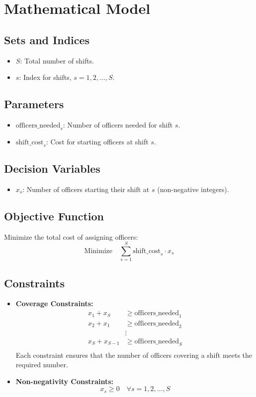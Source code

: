 \documentclass{article}
\begin{document}
\section*{Mathematical Model}

\subsection*{Sets and Indices}
\begin{itemize}
    \item \( S \): Total number of shifts.
    \item \( s \): Index for shifts, \( s = 1, 2, \ldots, S \).
\end{itemize}

\subsection*{Parameters}
\begin{itemize}
    \item \( \text{officers\_needed}_s \): Number of officers needed for shift \( s \).
    \item \( \text{shift\_cost}_s \): Cost for starting officers at shift \( s \).
\end{itemize}

\subsection*{Decision Variables}
\begin{itemize}
    \item \( x_s \): Number of officers starting their shift at \( s \) (non-negative integers).
\end{itemize}

\subsection*{Objective Function}
Minimize the total cost of assigning officers:
\[
\text{Minimize} \quad \sum_{s=1}^{S} \text{shift\_cost}_s \cdot x_s
\]

\subsection*{Constraints}

\begin{itemize}
    \item \textbf{Coverage Constraints:}
    \begin{align*}
        x_1 + x_S &\geq \text{officers\_needed}_1 \\
        x_2 + x_1 &\geq \text{officers\_needed}_2 \\
        &\vdots \\
        x_S + x_{S-1} &\geq \text{officers\_needed}_S \\
    \end{align*}
    Each constraint ensures that the number of officers covering a shift meets the required number.

    \item \textbf{Non-negativity Constraints:}
    \[
    x_s \geq 0 \quad \forall s = 1, 2, \ldots, S
    \]
\end{itemize}
\end{document}
